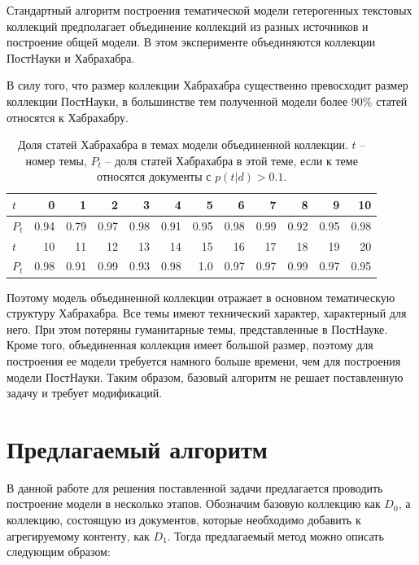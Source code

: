 Стандартный алгоритм построения тематической модели гетерогенных текстовых коллекций предполагает объединение коллекций из разных источников и построение общей модели. В этом эксперименте объединяются коллекции ПостНауки и Хабрахабра.

В силу того, что размер коллекции Хабрахабра существенно превосходит размер коллекции ПостНауки, в большинстве тем полученной модели более 90\% статей относятся к Хабрахабру.

\begin{table}[h!]
\centering
\vspace{1ex}
\begin{tabular}{l|r|r|r|r|r|r|r|r|r|r|r}

$t$ & 0 & 1 & 2 & 3 & 4 &5 & 6 & 7 & 8 & 9 & 10\\
\hline
$P_t$ & 0.94 &  0.79 & 0.97 & 0.98 & 0.91 & 0.95 & 0.98& 0.99 & 0.92 &  0.95 &  0.98 \\
\hline
\hline
$t$ & 10 & 11 & 12  &13 & 14 & 15 & 16 & 17  &18 & 19 & 20\\
\hline
$P_t$ & 0.98 &  0.91 & 0.99 &  0.93 &  0.98  & 1.0 & 0.97 &  0.97  &0.99 & 0.97 & 0.95\\
\end{tabular}
\caption{\label{table:baseline}Доля статей Хабрахабра в темах модели объединенной коллекции. $t$ -- номер темы, $P_t$ -- доля статей Хабрахабра в этой теме, если к теме относятся документы с $p(t|d) > 0.1$.}
\end{table}

Поэтому модель объединенной коллекции отражает в основном тематическую структуру Хабрахабра. Все темы имеют технический характер, характерный для него. При этом потеряны гуманитарные темы, представленные в ПостНауке.
Кроме того, объединенная коллекция имеет большой размер, поэтому для построения ее модели требуется намного больше времени, чем для построения модели ПостНауки.
Таким образом, базовый алгоритм не решает поставленную задачу и требует модификаций.

\section{Предлагаемый алгоритм}

В данной работе для решения поставленной задачи предлагается проводить построение модели в несколько этапов. Обозначим базовую коллекцию как $D_0$, а коллекцию, состоящую из документов, которые необходимо добавить к агрегируемому контенту, как $D_1$. Тогда предлагаемый метод можно описать следующим образом:

